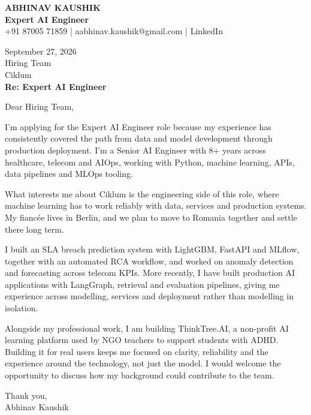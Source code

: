 \documentclass[10pt,a4paper]{article}
\begin{document}
\begin{center}
{\Large\bfseries ABHINAV KAUSHIK}\\[2pt]
{\bfseries Expert AI Engineer}\\[2pt]
+91 87005 71859 \quad | \quad aabhinav.kaushik@gmail.com \quad | \quad LinkedIn
\end{center}
\vspace{8pt}
September 27, 2026\\[6pt]
Hiring Team\\
Ciklum\\[4pt]
\textbf{Re: Expert AI Engineer}

Dear Hiring Team,

I’m applying for the Expert AI Engineer role because my experience has consistently covered the path from data and model development through production deployment. I’m a Senior AI Engineer with 8+ years across healthcare, telecom and AIOps, working with Python, machine learning, APIs, data pipelines and MLOps tooling.

What interests me about Ciklum is the engineering side of this role, where machine learning has to work reliably with data, services and production systems. My fiancée lives in Berlin, and we plan to move to Romania together and settle there long term.

I built an SLA breach prediction system with LightGBM, FastAPI and MLflow, together with an automated RCA workflow, and worked on anomaly detection and forecasting across telecom KPIs. More recently, I have built production AI applications with LangGraph, retrieval and evaluation pipelines, giving me experience across modelling, services and deployment rather than modelling in isolation.

Alongside my professional work, I am building ThinkTree.AI, a non-profit AI learning platform used by NGO teachers to support students with ADHD. Building it for real users keeps me focused on clarity, reliability and the experience around the technology, not just the model. I would welcome the opportunity to discuss how my background could contribute to the team.

Thank you,\\
Abhinav Kaushik
\end{document}
